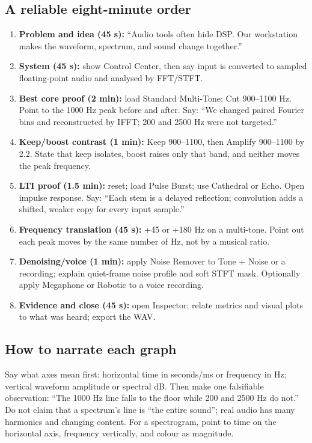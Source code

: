 \documentclass[11pt,a4paper]{article}
\begin{document}
\subsection{A reliable eight-minute order}
\begin{enumerate}
\item \textbf{Problem and idea (45 s):} ``Audio tools often hide DSP. Our workstation makes the waveform, spectrum, and sound change together.''
\item \textbf{System (45 s):} show Control Center, then say input is converted to sampled floating-point audio and analysed by FFT/STFT.
\item \textbf{Best core proof (2 min):} load Standard Multi-Tone; Cut 900--1100 Hz. Point to the 1000 Hz peak before and after. Say: ``We changed paired Fourier bins and reconstructed by IFFT; 200 and 2500 Hz were not targeted.''
\item \textbf{Keep/boost contrast (1 min):} Keep 900--1100, then Amplify 900--1100 by 2.2. State that keep isolates, boost raises only that band, and neither moves the peak frequency.
\item \textbf{LTI proof (1.5 min):} reset; load Pulse Burst; use Cathedral or Echo. Open impulse response. Say: ``Each stem is a delayed reflection; convolution adds a shifted, weaker copy for every input sample.''
\item \textbf{Frequency translation (45 s):} +45 or +180 Hz on a multi-tone. Point out each peak moves by the same number of Hz, not by a musical ratio.
\item \textbf{Denoising/voice (1 min):} apply Noise Remover to Tone + Noise or a recording; explain quiet-frame noise profile and soft STFT mask. Optionally apply Megaphone or Robotic to a voice recording.
\item \textbf{Evidence and close (45 s):} open Inspector; relate metrics and visual plots to what was heard; export the WAV.
\end{enumerate}

\subsection{How to narrate each graph}
Say what axes mean first: horizontal time in seconds/ms or frequency in Hz; vertical waveform amplitude or spectral dB. Then make one falsifiable observation: ``The 1000 Hz line falls to the floor while 200 and 2500 Hz do not.'' Do not claim that a spectrum's line is ``the entire sound''; real audio has many harmonics and changing content. For a spectrogram, point to time on the horizontal axis, frequency vertically, and colour as magnitude.
\end{document}
